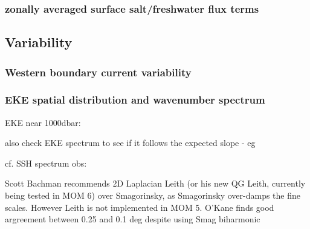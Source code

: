 \documentclass[11pt]{article}
\begin{document}
\subsubsection{zonally averaged surface salt/freshwater flux terms}

\subsection{Variability}
\citet{DanabasogluYeagerKimBehrensBentsenBiBiastochBleckBoning2016a}
\subsubsection{Western boundary current variability}
\subsubsection{EKE spatial distribution and wavenumber spectrum}

EKE near 1000dbar: \citet{OllitraultColindeVerdiere2014a}

also check EKE spectrum to see if it follows the expected slope - eg \citet{CapetMcWilliamsMolemakerShchepetkin2008a}

cf. SSH spectrum obs: \citet{XuFu2011a,XuFu2012a}
%

Scott Bachman recommends 2D Laplacian Leith (or his new QG Leith, currently being tested in MOM 6) over Smagorinsky, as Smagorinsky over-damps the fine scales. 
However Leith is not implemented in MOM 5.
O'Kane finds good argreement between 0.25 and 0.1 deg despite using Smag biharmonic
\end{document}
